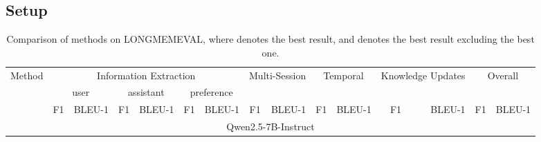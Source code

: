 \subsection{Setup}
\label{sec:exp:setup}
% 

\begin{table}[t]
\centering
\caption{Comparison of methods on LONGMEMEVAL, where  denotes the best result, and  denotes the best result excluding the best one.}
\small
\begin{tabular}{l|r|r|r|r|r|r|r|r|r|r|r|r|r|r}
\toprule
\multicolumn{1}{l}{\multirow{3}[2]{*}{Method}} & \multicolumn{6}{c}{Information Extraction} & \multicolumn{2}{c}{\multirow{2}[1]{*}{Multi-Session}} & \multicolumn{2}{c}{\multirow{2}[1]{*}{Temporal}} & \multicolumn{2}{c}{\multirow{2}[1]{*}{Knowledge Updates}} & \multicolumn{2}{c}{\multirow{2}[1]{*}{Overall}}\\ [-2pt] \cmidrule(lr){2-7}
 \multicolumn{1}{l}{} & \multicolumn{2}{c}{user}  & \multicolumn{2}{c}{assistant} & \multicolumn{2}{c}{preference} & \multicolumn{2}{c}{} & \multicolumn{2}{c}{} & \multicolumn{2}{c}{} \\ [-2pt] \cmidrule(lr){2-3} \cmidrule(lr){4-5} \cmidrule(lr){6-7} \cmidrule(lr){8-9} \cmidrule(lr){10-11} \cmidrule(lr){12-13} \cmidrule(lr){14-15}
 \multicolumn{1}{l}{} & \multicolumn{1}{r}{F1} &  \multicolumn{1}{r}{BLEU-1} & \multicolumn{1}{r}{F1} &  \multicolumn{1}{r}{BLEU-1}  & \multicolumn{1}{r}{F1} &  \multicolumn{1}{r}{BLEU-1} & \multicolumn{1}{r}{F1} &  \multicolumn{1}{r}{BLEU-1} & \multicolumn{1}{r}{F1} &  \multicolumn{1}{r}{BLEU-1} & \multicolumn{1}{r}{F1} &  \multicolumn{1}{r}{BLEU-1} & \multicolumn{1}{r}{F1} &  \multicolumn{1}{r}{BLEU-1}\\ \midrule
 \multicolumn{15}{c}{Qwen2.5-7B-Instruct}\\ \midrule

\end{tabular}
\end{table}
